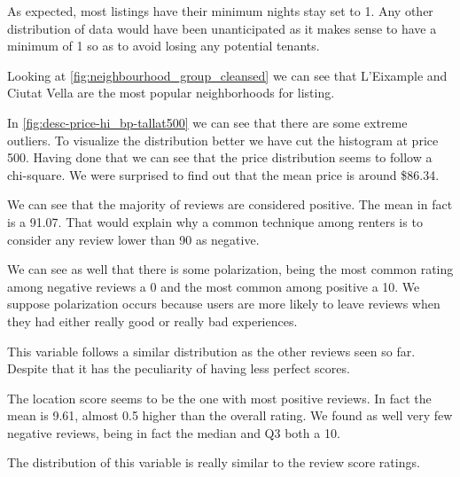 As expected, most listings have their minimum nights stay set to 1.
Any other distribution of data would have been
unanticipated as it makes sense to have a minimum of 1 so as to avoid
losing any potential tenants. 


Looking at \cref{fig:neighbourhood_group_cleansed} we can see that
L'Eixample and Ciutat Vella are the most popular neighborhoods for listing.



In \cref{fig:desc-price-hi_bp-tallat500} we can see that there are some extreme
outliers. To visualize the distribution better we have cut the histogram at
price 500. Having done that we can see that the price distribution seems to
follow a chi-square. We were surprised to find out that the mean price is around
\$86.34.



We can see that the majority of reviews are considered positive. The mean in
fact is a 91.07. That would explain why a common technique among renters is to
consider any review lower than 90 as negative.

We can see as well that there is some polarization, being the most common rating
among negative reviews a 0 and the most common among positive a 10. We suppose
polarization occurs because users are more likely to leave reviews when they had
either really good or really bad experiences.



This variable follows a similar distribution as the other reviews seen so far.
Despite that it has the peculiarity of having less perfect scores.



The location score seems to be the one with most positive reviews. In fact the
mean is 9.61, almost 0.5 higher than the overall rating. We found as well very
few negative reviews, being in fact the median and Q3 both a 10.



The distribution of this variable is really similar to the review score ratings.



